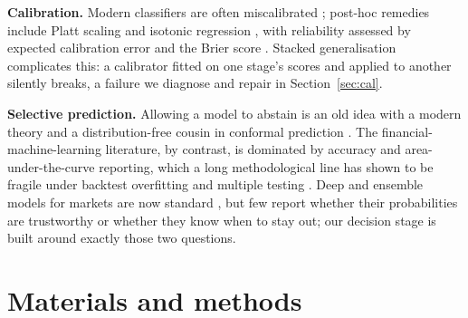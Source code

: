 \documentclass{elektr}
\begin{document}
\textbf{Calibration.} Modern classifiers are often miscalibrated \cite{guo2017}; post-hoc remedies include Platt scaling \cite{platt1999} and isotonic regression \cite{zadrozny2002}, with reliability assessed by expected calibration error and the Brier score \cite{naeini2015,brier1950}. Stacked generalisation \cite{wolpert1992} complicates this: a calibrator fitted on one stage's scores and applied to another silently breaks, a failure we diagnose and repair in Section~\ref{sec:cal}.

\textbf{Selective prediction.} Allowing a model to abstain is an old idea \cite{chow1970} with a modern theory \cite{elyaniv2010,geifman2017} and a distribution-free cousin in conformal prediction \cite{angelopoulos2021,gibbs2021,zaffran2022}. The financial-machine-learning literature, by contrast, is dominated by accuracy and area-under-the-curve reporting, which a long methodological line has shown to be fragile under backtest overfitting and multiple testing \cite{bailey2017,harvey2016}. Deep and ensemble models for markets are now standard \cite{gu2020,kelly2023}, but few report whether their probabilities are trustworthy or whether they know when to stay out; our decision stage is built around exactly those two questions.

\section{Materials and methods}
\label{sec:method}
\end{document}
